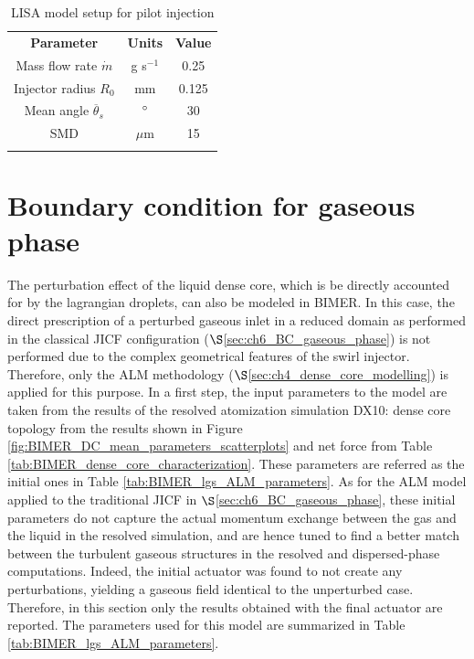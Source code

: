 

\begin{table}[!h]
\centering
\caption{LISA model setup for pilot injection}
\begin{tabular}{ccc}
\thickhline
\textbf{Parameter} & \textbf{Units} &  \textbf{Value} \\
\thickhline
Mass flow rate $\dot{m}$ & g s$^{-1}$ & 0.25 \\
Injector radius $R_0$ & mm & 0.125 \\
Mean angle $\overline{\theta}_s$ & $\degree$ & 30  \\
SMD & $\mu$m & 15 \\
\thickhline
\end{tabular}
\label{tab:LISA_model_parameters}
\end{table}



\section{Boundary condition for gaseous phase}
\label{sec:ch9_BIMER_BCs_for_gaseous_phase}

The perturbation effect of the liquid dense core, which is be directly accounted for by the lagrangian droplets, can also be modeled in BIMER. In this case, the direct prescription of a perturbed gaseous inlet in a reduced domain as performed in the classical JICF configuration ($\S$\ref{sec:ch6_BC_gaseous_phase}) is not performed due to the complex geometrical features of the swirl injector. Therefore, only the ALM methodology ($\S$\ref{sec:ch4_dense_core_modelling}) is applied for this purpose. In a first step, the input parameters to the model are taken from the results of the resolved atomization simulation DX10: dense core topology from the results shown in Figure \ref{fig:BIMER_DC_mean_parameters_scatterplots} and net force from Table \ref{tab:BIMER_dense_core_characterization}.  These parameters are referred as the initial ones in Table \ref{tab:BIMER_lgs_ALM_parameters}. As for the ALM model applied to the traditional JICF in $\S$\ref{sec:ch6_BC_gaseous_phase}, these initial parameters do not capture the actual momentum exchange between the gas and the liquid in the resolved simulation, and are hence tuned to find a better match between the turbulent gaseous structures in the resolved and dispersed-phase computations. Indeed, the initial actuator was found to not create any perturbations, yielding a gaseous field identical to the unperturbed case. Therefore, in this section only the results obtained with the final actuator are reported. The parameters used for this model are summarized in Table \ref{tab:BIMER_lgs_ALM_parameters}. 

